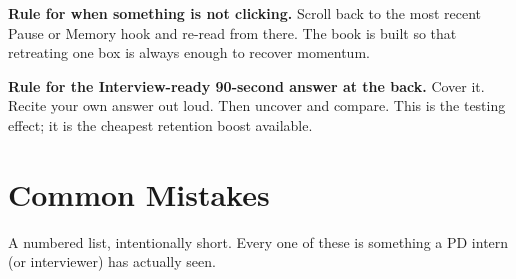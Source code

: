 \bigskip
\noindent\textbf{Rule for when something is not clicking.} Scroll back to the most recent Pause or Memory hook and re-read from there. The book is built so that retreating one box is always enough to recover momentum.

\bigskip
\noindent\textbf{Rule for the Interview-ready 90-second answer at the back.} Cover it. Recite your own answer out loud. Then uncover and compare. This is the testing effect; it is the cheapest retention boost available.

\tableofcontents

\mainmatter













\chapter{Common Mistakes}

A numbered list, intentionally short. Every one of these is something a PD intern (or interviewer) has actually seen.

